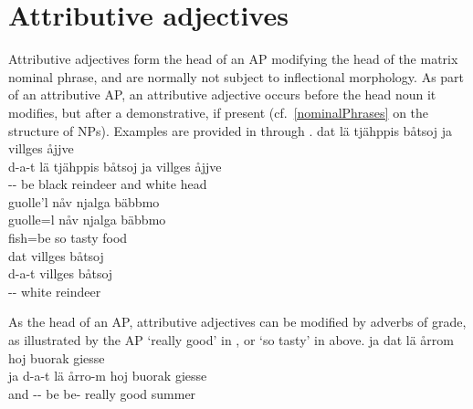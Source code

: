 \section{Attributive adjectives}\label{adjectivesATTR}
Attributive adjectives form the head of an AP modifying the head of the matrix nominal phrase, and are normally not subject to inflectional morphology. 
As part of an attributive AP, an attributive adjective occurs before the head noun it modifies, but after a demonstrative, if present (cf.~\SEC\ref{nominalPhrases} on the structure of NPs). Examples are provided in  through . 
\ea\label{adjEx1}
\glll	dat lä tjähppis båtsoj ja villges åjjve\\
	d-a-t lä tjähppis båtsoj ja villges åjjve\\
	-- be\BS{} black reindeer\BS{} and white head\BS{}\\\nopagebreak
{}	
\z
\ea\label{adjEx2}
\glll	guolle'l nåv njalga bäbbmo\\
	guolle=l nåv njalga bäbbmo\\
	fish\BS{}=be\BS{} so tasty food\BS{}\\\nopagebreak
{}	
\z
\ea\label{adjEx3}
\glll	dat villges båtsoj\\
	d-a-t villges båtsoj\\
	-- white reindeer\BS{}\\\nopagebreak
{}	
\z

As the head of an AP, attributive adjectives can be modified by adverbs of grade, as illustrated by the AP  ‘really good’ in , or  ‘so tasty’ in  above.
\ea\label{adjEx4}
\glll	ja dat lä årrom hoj buorak giesse\\
	ja d-a-t lä årro-m hoj buorak giesse\\
	and -- be\BS{} be- really good summer\BS{}\\\nopagebreak
{}	
\z

